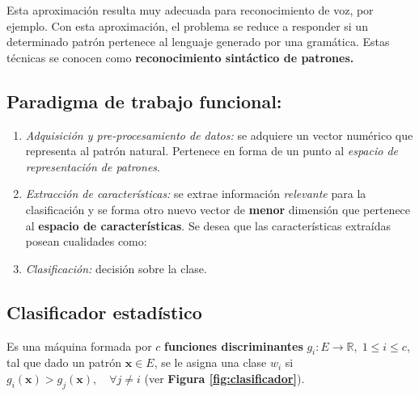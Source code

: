 \documentclass[10pt,a4paper]{article}
\begin{document}
Esta aproximación resulta muy adecuada para reconocimiento de voz, por ejemplo. Con esta aproximación, el problema se reduce a responder si un determinado patrón pertenece al lenguaje generado por una gramática. Estas técnicas se conocen como \textbf{reconocimiento sintáctico de patrones.}

\subsection{Paradigma de trabajo funcional:}

\begin{enumerate}
\item \textit{Adquisición y pre-procesamiento de datos:} se adquiere un vector numérico que representa al patrón natural. Pertenece en forma de un punto al \textit{espacio de representación de patrones}.
\item \textit{Extracción de características:} se extrae información \textit{relevante} para la clasificación y se forma otro nuevo vector de \textbf{menor} dimensión que pertenece al \textbf{espacio de características}. Se desea que las características extraídas posean cualidades como:

\item \textit{Clasificación:} decisión sobre la clase.
\end{enumerate}

\subsection{Clasificador estadístico}

Es una máquina formada por $c$ \textbf{funciones discriminantes} $g_i : E \rightarrow \mathbb{R}, \; 1 \leq i \leq c$, tal que dado un patrón $\mathbf{x} \in E$, se le asigna una clase $w_i$ si $g_i(\mathbf{x}) >g_j(\mathbf{x}), \quad \forall j \neq i$ (ver \textbf{Figura \ref{fig:clasificador}}).
\end{document}
